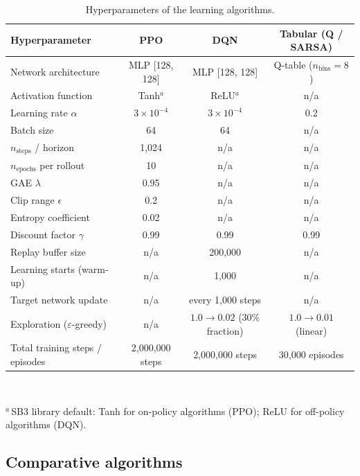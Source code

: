 \documentclass[11pt,a4paper]{article}
\begin{document}
\begin{table}[H]
\centering
\caption{Hyperparameters of the learning algorithms.}
\label{tab:hyper}
\footnotesize
\setlength{\tabcolsep}{5pt}
\begin{tabular}{lccc}
\toprule
\textbf{Hyperparameter} & \textbf{PPO} & \textbf{DQN} & \textbf{Tabular (Q / SARSA)} \\
\midrule
Network architecture           & MLP [128, 128] & MLP [128, 128] & Q-table ($n_{\text{bins}}=8$) \\
Activation function            & Tanh$^{a}$     & ReLU$^{a}$     & n/a \\
Learning rate $\alpha$         & $3\times10^{-4}$ & $3\times10^{-4}$ & 0.2   \\
Batch size                     & 64             & 64             & n/a \\
$n_{\mathrm{steps}}$ / horizon & 1,024          & n/a & n/a \\
$n_{\mathrm{epochs}}$ per rollout & 10          & n/a & n/a \\
GAE $\lambda$                  & 0.95           & n/a & n/a \\
Clip range $\epsilon$          & 0.2            & n/a & n/a \\
Entropy coefficient            & 0.02           & n/a & n/a \\
Discount factor $\gamma$       & 0.99           & 0.99           & 0.99    \\
Replay buffer size             & n/a & 200,000        & n/a \\
Learning starts (warm-up)      & n/a & 1,000          & n/a \\
Target network update          & n/a & every 1,000 steps & n/a \\
Exploration ($\varepsilon$-greedy) & n/a & $1.0\to0.02$ (30\% fraction) & $1.0\to0.01$ (linear) \\
Total training steps / episodes & 2,000,000 steps & 2,000,000 steps & 30,000 episodes \\
\bottomrule
\end{tabular}
\\[4pt]
\raggedright
\footnotesize $^{a}$\,SB3 library default: Tanh for on-policy algorithms (PPO); ReLU for off-policy algorithms (DQN).\\
\end{table}

\subsection{Comparative algorithms}
\end{document}
